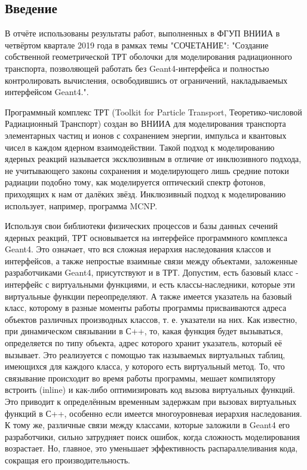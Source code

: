 \documentclass[a4paper,12pt]{article}
\begin{document}
\newpage

\tableofcontents

\begin{large}

\clearpage
\section{Введение}
\label{Intr}
  В отчёте использованы результаты работ, выполненных в ФГУП ВНИИА в четвёртом квартале 2019 года в рамках темы "СОЧЕТАНИЕ": "Создание собственной геометрической ТРТ оболочки для моделирования радиационного транспорта, позволяющей работать без Geant4-интерфейса и полностью контролировать вычисления, освободившись от ограничений, накладываемых интерфейсом Geant4.".

    Программный комплекс ТРТ (Toolkit for Particle Transport, Теоретико-числовой Радиационный Транспорт) создан во ВНИИА для моделирования транспорта элементарных частиц и ионов с сохранением энергии, импульса и квантовых чисел в каждом ядерном взаимодействии.
    Такой подход к моделированию ядерных реакций называется эксклюзивным в отличие от инклюзивного подхода, не учитывающего законы сохранения и моделирующего лишь средние потоки радиации подобно тому, как моделируется оптический спектр фотонов, приходящих к нам от далёких звёзд. Инклюзивный подход к моделированию использует, например, программа MCNP.
    
    Используя свои библиотеки физических процессов и базы данных сечений ядерных реакций, ТРТ основывается на интерфейсе программного комплекса Geant4. Это означает, что вся сложная иерархия наследования классов и интерфейсов, а также непростые взаимные связи между объектами, заложенные разработчиками Geant4, присутствуют и в ТРТ. Допустим, есть базовый класс - интерфейс с виртуальными функциями, и есть классы-наследники, которые эти виртуальные функции переопределяют. А также имеется указатель на базовый класс, которому в разные моменты работы программы присваиваются адреса объектов различных производных классов, т. е. указатели на них.  Как известно, при динамическом связывании в С++, то, какая функция будет вызываться, определяется по типу объекта, адрес которого хранит указатель, который её вызывает. Это реализуется с помощью так называемых виртуальных таблиц, имеющихся для каждого класса, у которого есть виртуальный метод. То, что связывание происходит во время работы программы, мешает компилятору встроить (inline) и  как-либо оптимизировать код вызова виртуальных функций. Это приводит к определённым временным задержкам при вызовах виртуальных функций в С++, особенно если имеется многоуровневая иерархия наследования. К тому же, различные связи между классами, которые заложили в Geant4 его разработчики, сильно затрудняет поиск ошибок, когда сложность моделирования возрастает. Но, главное, это уменьшает эффективность распараллеливания кода, сокращая его производительность.
    

\end{large}
\end{document}
